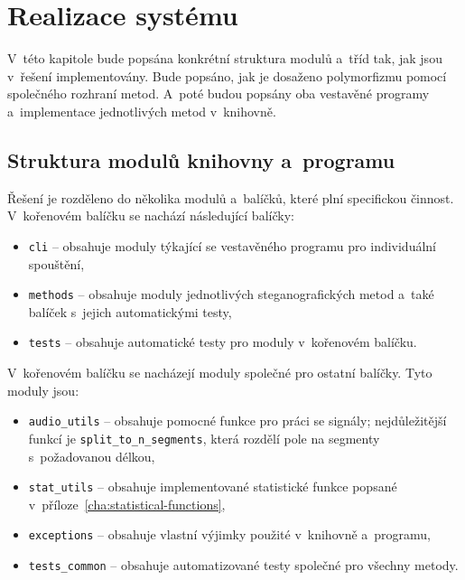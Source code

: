 \chapter{Realizace systému}
\label{cha:implementation}

V~této kapitole bude popsána konkrétní struktura modulů a~tříd tak, jak jsou
v~řešení implementovány. Bude popsáno, jak je dosaženo polymorfizmu pomocí
společného rozhraní metod. A~poté budou popsány oba vestavěné programy
a~implementace jednotlivých metod v~knihovně.

\section{Struktura modulů knihovny a~programu}
\label{sec:modules}

Řešení je rozděleno do několika modulů a~balíčků, které plní specifickou
činnost. V~kořenovém balíčku se nachází následující balíčky:

\begin{itemize}
    \item \texttt{cli} -- obsahuje moduly týkající se vestavěného programu pro
        individuální spouštění,
    \item \texttt{methods} -- obsahuje moduly jednotlivých steganografických
        metod a~také balíček s~jejich automatickými testy,
    \item \texttt{tests} -- obsahuje automatické testy pro moduly v~kořenovém
        balíčku.
\end{itemize}

\noindent V~kořenovém balíčku se nacházejí moduly společné pro ostatní balíčky.
Tyto moduly jsou:

\begin{itemize}
    \item \texttt{audio\_utils} -- obsahuje pomocné funkce pro práci se
        signály; nejdůležitější funkcí je \texttt{split\_to\_n\_segments},
        která rozdělí pole na segmenty s~požadovanou délkou,
    \item \texttt{stat\_utils} -- obsahuje implementované statistické funkce
        popsané v~příloze~\ref{cha:statistical-functions},
    \item \texttt{exceptions} -- obsahuje vlastní výjimky použité v~knihovně
        a~programu,
    \item \texttt{tests\_common} -- obsahuje automatizované testy společné pro
        všechny metody.
\end{itemize}


